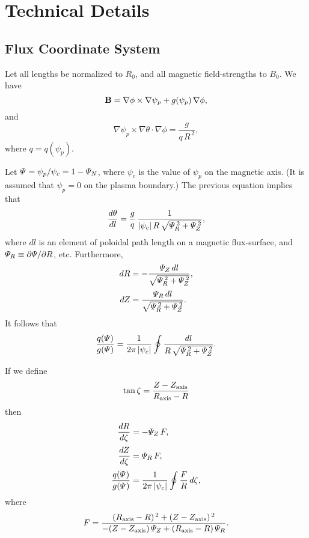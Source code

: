 \documentclass[notitlepage,12pt]{article}
\begin{document}
\section{Technical Details}
\subsection{Flux Coordinate System}
Let all lengths be normalized to $R_0$, and all magnetic field-strengths to $B_0$. 
We have
\begin{equation}
{\bf B} =\nabla\phi\times \nabla\psi_p +g(\psi_p)\,\nabla\phi,
\end{equation}
and
\begin{equation}
\nabla\psi_p\times \nabla\theta\cdot\nabla\phi = \frac{g}{q\,R^{\,2}},
\end{equation}
where $q=q(\psi_p)$. 

Let ${\mit\Psi}=\psi_p/\psi_c = 1-{\mit\Psi}_N$, where $\psi_c$ is the value
of $\psi_p$ on the magnetic axis. (It is assumed that $\psi_p=0$ on the plasma boundary.) 
The previous equation implies that
\begin{equation}
\frac{d\theta}{dl} = \frac{g}{q}\,\frac{1}{|\psi_c|\,R\,\sqrt{{\mit\Psi}_R^{\,2}+{\mit\Psi}_Z^{\,2}}},
\end{equation}
where $dl$ is an element of poloidal path length on a magnetic flux-surface, and ${\mit\Psi}_R\equiv \partial{\mit\Psi}/\partial R$, etc. Furthermore,
\begin{align}
dR &= -\frac{{\mit\Psi}_Z\,dl}{\sqrt{{\mit\Psi}_R^{\,2}+{\mit\Psi}_Z^{\,2}}},\\[0.5ex]
dZ&= \frac{{\mit\Psi}_R\,dl}{\sqrt{{\mit\Psi}_R^{\,2}+{\mit\Psi}_Z^{\,2}}}.
\end{align}
It follows that
\begin{equation}
\frac{q({\mit\Psi})}{g({\mit\Psi})} = \frac{1}{2\pi\,|\psi_c|}\oint \frac{dl}{R\,\sqrt{{\mit\Psi}_R^{\,2}+{\mit\Psi}_Z^{\,2}}}.
\end{equation}

If we define
\begin{equation}
\tan\zeta = \frac{Z-Z_{\rm axis}}{R_{\rm axis}-R}
\end{equation}
then
\begin{align}
\frac{dR}{d\zeta} &= -{\mit\Psi}_Z\,F,\\[0.5ex]
\frac{dZ}{d\zeta} &= {\mit\Psi}_R\,F,\\[0.5ex]
\frac{q({\mit\Psi})}{g({\mit\Psi})} &= \frac{1}{2\pi\,|\psi_c|}\oint \frac{F}{R}\,d\zeta,
\end{align}
where
\begin{equation}
F = \frac{(R_{\rm axis}-R)^{\,2} + (Z-Z_{\rm axis})^{\,2}}{-(Z-Z_{\rm axis})\,{\mit\Psi}_Z + (R_{\rm axis}-R)\,{\mit\Psi}_R}.
\end{equation}
\end{document}
